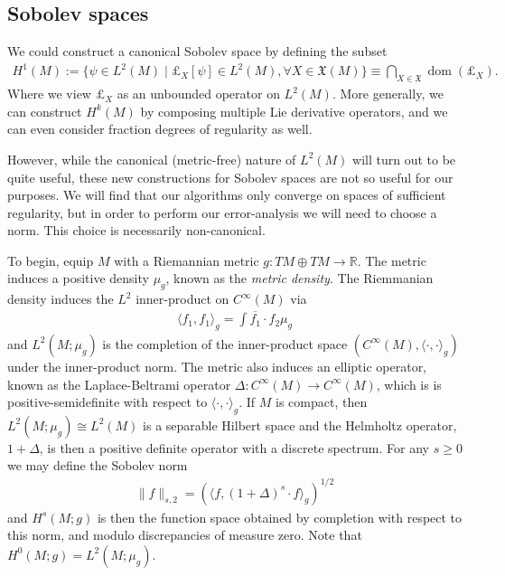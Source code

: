 \documentclass[12pt]{amsart}
\begin{document}
\subsection{Sobolev spaces}
\label{sec:Sobolev spaces}
We could construct a canonical Sobolev space by defining the subset
\begin{align*}
	H^{1}(M) := \{ \psi \in L^{2}(M) \mid \pounds_{X}[\psi] \in L^{2}(M) , \forall X \in \mathfrak{X}(M) \} \equiv \bigcap_{X \in \mathfrak{X}} \operatorname{dom}( \pounds_{X} ).
\end{align*}
Where we view $\pounds_{X}$ as an unbounded operator on $L^{2}(M)$.
More generally, we can construct $H^{k}(M)$ by composing multiple Lie derivative operators,
and we can even consider fraction degrees of regularity as well.

  However, while the canonical (metric-free) nature of $L^{2}(M)$ will turn out to be quite useful,
  these new constructions for Sobolev spaces are not so useful for our purposes.
  We will find that our algorithms only converge on spaces of sufficient regularity,
  but in order to perform our error-analysis we will need to choose a norm.
  This choice is necessarily non-canonical.

To begin, equip $M$ with a Riemannian metric $g:TM \oplus TM \to \mathbb{R}$.
The metric induces a positive density $\mu_g$,
known as the \emph{metric density}. 
The Riemmanian density induces the $L^2$ inner-product on $C^\infty(M)$ via
\begin{align*}
	\langle f_1 , f_1 \rangle_{g} = \int \overline{f_1} \cdot f_2 \mu_g
\end{align*}
and $L^{2}(M;\mu_{g})$ is the completion of the inner-product space $( C^{\infty}(M) , \langle \cdot , \cdot \rangle_{g})$ under 
the inner-product norm.
The metric also induces an elliptic operator, known as the Laplace-Beltrami operator $\Delta: C^{\infty}(M) \to C^{\infty}(M)$, which is is positive-semidefinite
with respect to $\langle \cdot , \cdot \rangle_{g}$.
If $M$ is compact, then $L^2(M ; \mu_g) \cong L^2(M)$ is a separable Hilbert space
and the Helmholtz operator, $1 + \Delta$, is then a positive definite operator
with a discrete spectrum.
For any $s \geq 0$ we may define the Sobolev norm
\begin{align*}
	\| f \|_{s,2} =  \left( \langle f , (1+\Delta)^s \cdot f \rangle_{g} \right)^{1/2}
\end{align*}
and $H^s(M ; g)$ is then the function space obtained by completion with respect to this norm, and modulo discrepancies of measure zero.
Note that $H^0(M;g) = L^2(M;\mu_g)$.
\end{document}
